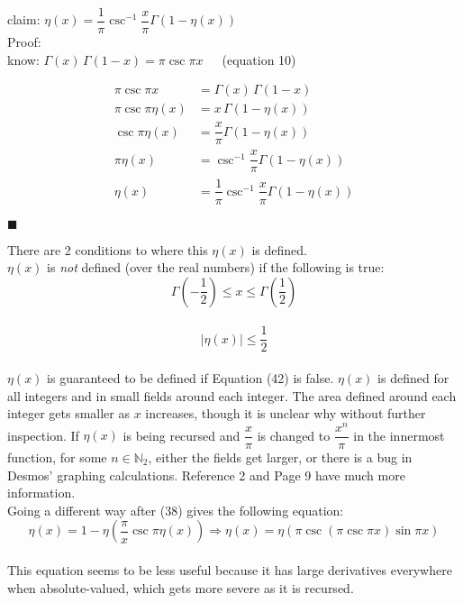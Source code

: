 \documentclass[12pt]{article}
\providecommand \pgrp [1] {\left( #1 \right)}   %
\providecommand \setN {\mathbb N}
\begin{document}
claim: $\eta(x) = \dfrac 1\pi \csc^{-1}\dfrac x\pi \Gamma(1 - \eta(x))$\\
Proof:\\
know: $\Gamma(x)\,\Gamma(1 - x) = \pi\csc\pi x$~~~(equation 10)

\begin{align} %
	\pi \csc\pi x & = \Gamma(x)\,\Gamma(1 - x)\\
	\pi \csc \pi\eta(x) & = x\,\Gamma(1 - \eta(x))\\
	\csc \pi\eta(x) & = \dfrac x\pi \Gamma(1 - \eta(x))\\
	\pi \eta(x) & = \csc^{-1}\dfrac x\pi \Gamma(1 - \eta(x))\\
	\eta(x) & = \dfrac 1\pi \csc^{-1}\dfrac x\pi \Gamma(1 - \eta(x))
\end{align}

\noindent $\blacksquare$

\noindent There are 2 conditions to where this $\eta(x)$ is defined.\\
$\eta(x)$ is \emph{not} defined (over the real numbers) if the following is true:\\
\begin{equation}
	\Gamma\!\pgrp{-\dfrac 12} \le x \le \Gamma\!\pgrp{\dfrac 12}
\end{equation}\\ %
\begin{equation*}
	|\eta(x)| \le \dfrac 12
\end{equation*}\\

$\eta(x)$ is guaranteed to be defined if Equation (42) is false. $\eta(x)$ is
defined for all integers and in small fields around each integer. The area defined
around each integer gets smaller as $x$ increases, though it is unclear why without
further inspection. If $\eta(x)$ is being recursed and $\dfrac x\pi$ is changed to
$\dfrac{x^n}\pi$ in the innermost function, for some $n\in\setN_2$, either the
fields get larger, or there is a bug in Desmos' graphing calculations. Reference 2
and Page 9 have much more information.\\
Going a different way after (38) gives the following equation:\\
\begin{equation}
	\eta(x) = 1 - \eta\!\pgrp{\dfrac\pi x \csc\pi\eta(x)} \Longrightarrow
	\eta(x) = \eta(\pi \csc(\pi \csc\pi x) \sin\pi x)
\end{equation}\\ %
This equation seems to be less useful because it has large derivatives everywhere
when absolute-valued, which gets more severe as it is recursed.
\end{document}
